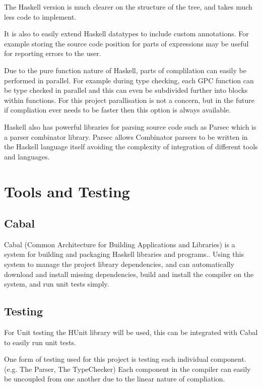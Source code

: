 The Haskell version is much clearer on the structure of the tree, and takes much
less code to implement. 

It is also to easily extend Haskell datatypes to include
custom annotations. For example storing the source code position for parts of expressions may
be useful for reporting errors to the user.

Due to the pure function nature of Haskell, parts of complilation can easily be performed in parallel.
For example during type checking, each GPC function can be type checked in parallel and this can even be subdivided 
further into blocks within functions. For this project parallisation is not a concern, but in the future if compliation ever
needs to be faster then this option is always available.

Haskell also has powerful libraries for parsing source code such as Parsec which is a parser combinator
library. Parsec allows Combinator parsers to be written in the Haskell language itself avoiding the complexity
of integration of different tools and languages. 
\cite{parsec}

\section{Tools and Testing}

\subsection{Cabal}

Cabal (Common Architecture for Building Applications and Libraries) is a system for building and
packaging Haskell libraries and programs.\cite{cabal}. Using this system to manage the
project library dependencies, and can automatically download and install missing dependencies,
build and install the compiler on the system, and run unit tests simply.

\subsection{Testing}

For Unit testing the HUnit library will be used, this can be integrated
with Cabal to easily run unit tests.

One form of testing used for this project is testing each individual component.
(e.g. The Parser, The TypeChecker) Each component in the compiler can easily
be uncoupled from one another due to the linear nature of compliation.

